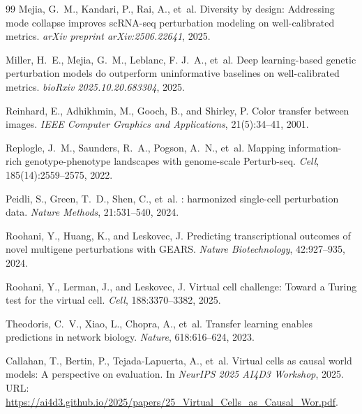 \documentclass{article}
\theoremstyle{plain}
\theoremstyle{definition}
\theoremstyle{remark}
\begin{document}
\begin{thebibliography}{99}
Mejia, G.~M., Kandari, P., Rai, A., et~al.
\newblock Diversity by design: Addressing mode collapse improves {scRNA-seq} perturbation modeling on well-calibrated metrics.
\newblock \emph{arXiv preprint arXiv:2506.22641}, 2025.

Miller, H.~E., Mejia, G.~M., Leblanc, F. J.~A., et~al.
\newblock Deep learning-based genetic perturbation models do outperform uninformative baselines on well-calibrated metrics.
\newblock \emph{bioRxiv 2025.10.20.683304}, 2025.

Reinhard, E., Adhikhmin, M., Gooch, B., and Shirley, P.
\newblock Color transfer between images.
\newblock \emph{IEEE Computer Graphics and Applications}, 21(5):34--41, 2001.

Replogle, J.~M., Saunders, R.~A., Pogson, A.~N., et~al.
\newblock Mapping information-rich genotype-phenotype landscapes with genome-scale {Perturb-seq}.
\newblock \emph{Cell}, 185(14):2559--2575, 2022.

Peidli, S., Green, T.~D., Shen, C., et~al.
: harmonized single-cell perturbation data.
\newblock \emph{Nature Methods}, 21:531--540, 2024.

Roohani, Y., Huang, K., and Leskovec, J.
\newblock Predicting transcriptional outcomes of novel multigene perturbations with {GEARS}.
\newblock \emph{Nature Biotechnology}, 42:927--935, 2024.

Roohani, Y., Lerman, J., and Leskovec, J.
\newblock Virtual cell challenge: Toward a {Turing} test for the virtual cell.
\newblock \emph{Cell}, 188:3370--3382, 2025.

Theodoris, C.~V., Xiao, L., Chopra, A., et~al.
\newblock Transfer learning enables predictions in network biology.
\newblock \emph{Nature}, 618:616--624, 2023.

Callahan, T., Bertin, P., Tejada-Lapuerta, A., et~al.
\newblock Virtual cells as causal world models: A perspective on evaluation.
\newblock In \emph{NeurIPS 2025 AI4D3 Workshop}, 2025.
\newblock URL: \url{https://ai4d3.github.io/2025/papers/25_Virtual_Cells_as_Causal_Wor.pdf}.


\end{thebibliography}
\end{document}
